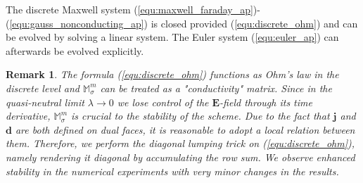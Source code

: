 \documentclass{article}
\newtheorem*{remark}{Remark}
\begin{document}
The discrete Maxwell system (\ref{equ:maxwell_faraday_ap})-(\ref{equ:gauss_nonconducting_ap}) is closed provided (\ref{equ:discrete_ohm}) and can be evolved by solving a linear system. The Euler system (\ref{equ:euler_ap}) can afterwards be evolved explicitly. 

\begin{remark}
    The formula (\ref{equ:discrete_ohm}) functions as Ohm's law in the discrete level and $\mathbb{M}_\sigma^m$ can be treated as a "conductivity" matrix. Since in the quasi-neutral limit $\lambda \rightarrow 0$ we lose control of the $\mathbf{E}$-field through its time derivative, $\mathbb{M}_\sigma^m$ is crucial to the stability of the scheme. Due to the fact that $\mathbf{j}$ and $\mathbf{d}$ are both defined on dual faces, it is reasonable to adopt a local relation between them. Therefore, we perform the \emph{diagonal lumping} trick on (\ref{equ:discrete_ohm}), namely rendering it diagonal by accumulating the row sum. We observe enhanced stability in the numerical experiments with very minor changes in the results.
\end{remark}
\end{document}
